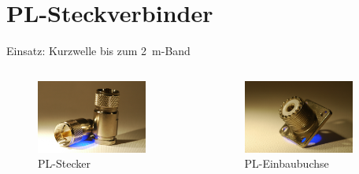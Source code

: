 
\section{PL-Steckverbinder}
\label{section:steckverbinder_pl}
\begin{frame}%
Einsatz: Kurzwelle bis zum \qty{2}{\metre}-Band
\begin{columns}
    \begin{column}{0.48\textwidth}
    
\begin{figure}
    \includegraphics[width=0.85\textwidth]{foto/69}
    \caption{\scriptsize PL-Stecker}
    \label{n_koaxsteckverbinder_pl_stecker}
\end{figure}

    \end{column}
   \begin{column}{0.48\textwidth}
       
\begin{figure}
    \includegraphics[width=0.85\textwidth]{foto/70}
    \caption{\scriptsize PL-Einbaubuchse}
    \label{n_koaxsteckverbinder_pl_einbaubuchse}
\end{figure}

   \end{column}
\end{columns}

\end{frame}

